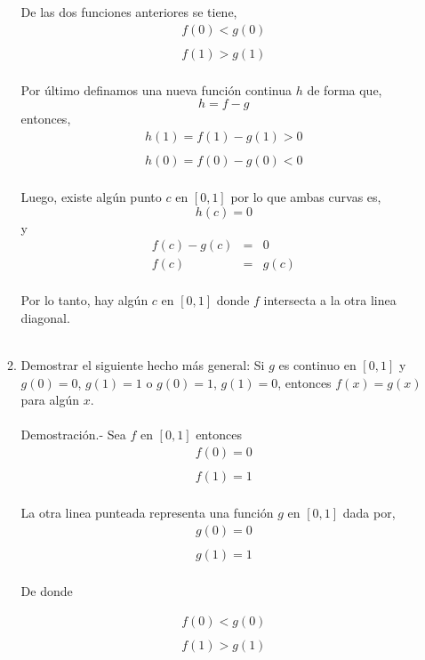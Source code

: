 \begin{enumerate}[\bfseries 1.]
\begin{enumerate}[\bfseries (a)]
	    De las dos funciones anteriores se tiene,
	    $$\begin{array}{l}
		f(0)<g(0)\\\\
		f(1)>g(1)\\
	    \end{array}$$

	    Por último definamos una nueva función continua $h$ de forma que,
	    $$h=f-g$$
	    entonces,
	    $$\begin{array}{l}
		h(1)=f(1)-g(1)>0\\\\
		h(0)=f(0)-g(0)<0\\
	    \end{array}$$
	    
	    Luego, existe algún punto $c$ en $[0,1]$ por lo que ambas curvas es,
	    $$h(c)=0$$
	    y 
	    $$\begin{array}{rcl}
		f(c)-g(c)&=&0\\
		f(c)&=&g(c)\\
	    \end{array}$$

	    Por lo tanto, hay algún $c$ en $[0,1]$ donde $f$ intersecta a la otra linea diagonal.\\\\

	\item Demostrar el siguiente hecho más general: Si $g$ es continuo en $[0,1]$ y $g(0)=0$, $g(1)=1$ o $g(0)=1$, $g(1)=0$, entonces $f(x)=g(x)$ para algún $x$.\\\\
	    Demostración.-\;  Sea $f$ en $[0,1]$ entonces
	    $$\begin{array}{l}
		f(0)=0\\\\
		f(1)=1\\
	    \end{array}$$

	    La otra linea punteada representa una función $g$ en $[0,1]$ dada por,
	    $$\begin{array}{l}
		g(0)=0\\\\
		g(1)=1\\
	    \end{array}$$

	    De donde 

	    $$\begin{array}{l}
		f(0)<g(0)\\\\
		f(1)>g(1)\\
	    \end{array}$$


\end{enumerate}
\end{enumerate}
